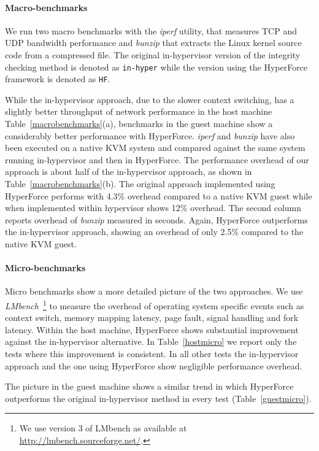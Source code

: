 \paragraph{Macro-benchmarks} \label{macrobench}
We run two macro benchmarks with the \emph{iperf} utility, that measures TCP and UDP bandwidth performance and \emph{bunzip} that extracts the Linux kernel source code from a compressed file. The original in-hypervisor version of the integrity checking method is denoted as \texttt{in-hyper} while the version using the HyperForce framework is denoted as \texttt{HF}.

While the in-hypervisor approach, due to the slower context switching, has a slightly better throughput of network performance in the host machine
Table~\ref{macrobenchmarks}(a), benchmarks in the guest machine show a considerably better performance with HyperForce.   
\emph{iperf} and \emph{bunzip} have also been executed on a native KVM system and compared against the same system running in-hypervisor and then in HyperForce. 
The performance overhead of our approach is about half of the in-hypervisor approach, as shown in Table~\ref{macrobenchmarks}(b). The original approach implemented using HyperForce performs with 4.3\% overhead compared to a native KVM guest while when implemented within hypervisor shows 12\% overhead.
The second column reports overhead of \textit{bunzip} measured in seconds. Again, HyperForce outperforms the in-hypervisor approach, showing an overhead of only 2.5\% compared to the native KVM guest.
  

\paragraph{Micro-benchmarks} \label{microbench}
Micro benchmarks show a more detailed picture of the two approaches. 
We use \emph{LMbench}~\cite{lmbench-paper}\footnote{We use version 3 of
LMbench as available at \url{http://lmbench.sourceforge.net/}.} to measure the overhead of operating system specific events such as context switch, memory mapping latency, page fault, signal handling and fork latency.
Within the host machine, HyperForce shows substantial improvement against the in-hypervisor alternative. 
In Table~\ref{hostmicro} we report only the tests where this improvement is consistent. In all other tests the in-hypervisor approach and the one using HyperForce show negligible performance overhead. 

The picture in the guest machine shows a similar trend in which HyperForce outperforms the original in-hypervisor method in every test (Table~\ref{guestmicro}).


